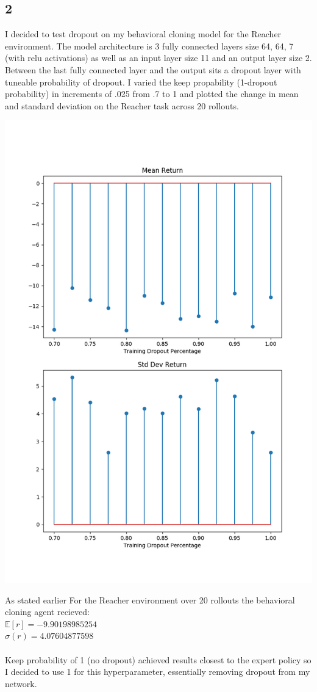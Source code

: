 \documentclass[12pt]{report}
\begin{document}
\subsection*{2}
I decided to test dropout on my behavioral cloning model for the Reacher environment. The model architecture is 3 fully connected layers size 64, 64, 7 (with relu activations) as well as an input layer  size 11 and an output layer size 2. Between the last fully connected layer and the output sits a dropout layer with tuneable probability of dropout. I varied the keep propability (1-dropout probability) in increments of .025 from .7 to 1 and plotted the change in mean and standard deviation on the Reacher task across 20 rollouts.
\begin{center}
\includegraphics[scale=.5]{./images/2_2.png}
\end{center}
As stated earlier For the Reacher environment over 20 rollouts the behavioral cloning agent recieved:\\
$\mathbb{E}[r]=-9.90198985254$\\
$\sigma(r) =  4.07604877598$\\
\\

Keep probability of 1 (no dropout) achieved results closest to the expert policy so I decided to use 1 for this hyperparameter, essentially removing dropout from my network.
\end{document}
